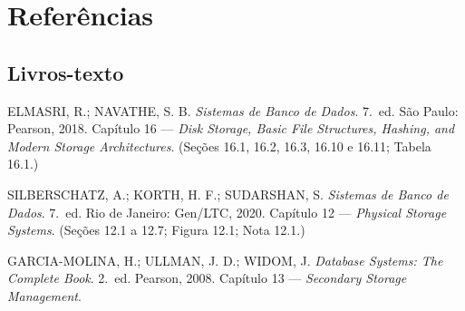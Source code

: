 \documentclass[11pt,a4paper]{article}
\begin{document}
\section{Referências}
\begingroup\small

\subsection*{Livros-texto}
\begin{enumerate}[label={[\arabic*]},leftmargin=*]
\item ELMASRI, R.; NAVATHE, S. B. \emph{Sistemas de Banco de Dados}. 7.\ ed. São Paulo:
      Pearson, 2018. Capítulo 16 --- \emph{Disk Storage, Basic File Structures, Hashing, and
      Modern Storage Architectures}. (Seções 16.1, 16.2, 16.3, 16.10 e 16.11; Tabela 16.1.)
\item SILBERSCHATZ, A.; KORTH, H. F.; SUDARSHAN, S. \emph{Sistemas de Banco de Dados}.
      7.\ ed. Rio de Janeiro: Gen/LTC, 2020. Capítulo 12 --- \emph{Physical Storage Systems}.
      (Seções 12.1 a 12.7; Figura 12.1; Nota 12.1.)
\item GARCIA-MOLINA, H.; ULLMAN, J. D.; WIDOM, J. \emph{Database Systems: The Complete
      Book}. 2.\ ed. Pearson, 2008. Capítulo 13 --- \emph{Secondary Storage Management}.
\end{enumerate}
\end{document}
